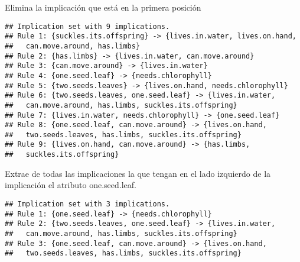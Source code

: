 \documentclass[
]{book}
\newenvironment{Shaded}{\begin{snugshade}}{\end{snugshade}}
\newcommand{\AttributeTok}[1]{\textcolor[rgb]{0.77,0.63,0.00}{#1}}
\newcommand{\DecValTok}[1]{\textcolor[rgb]{0.00,0.00,0.81}{#1}}
\newcommand{\FunctionTok}[1]{\textcolor[rgb]{0.00,0.00,0.00}{#1}}
\newcommand{\NormalTok}[1]{#1}
\newcommand{\OtherTok}[1]{\textcolor[rgb]{0.56,0.35,0.01}{#1}}
\newcommand{\SpecialCharTok}[1]{\textcolor[rgb]{0.00,0.00,0.00}{#1}}
\newcommand{\StringTok}[1]{\textcolor[rgb]{0.31,0.60,0.02}{#1}}
\begin{document}
Elimina la implicación que está en la primera posición

\begin{Shaded}
\end{Shaded}

\begin{verbatim}
## Implication set with 9 implications.
## Rule 1: {suckles.its.offspring} -> {lives.in.water, lives.on.hand,
##   can.move.around, has.limbs}
## Rule 2: {has.limbs} -> {lives.in.water, can.move.around}
## Rule 3: {can.move.around} -> {lives.in.water}
## Rule 4: {one.seed.leaf} -> {needs.chlorophyll}
## Rule 5: {two.seeds.leaves} -> {lives.on.hand, needs.chlorophyll}
## Rule 6: {two.seeds.leaves, one.seed.leaf} -> {lives.in.water,
##   can.move.around, has.limbs, suckles.its.offspring}
## Rule 7: {lives.in.water, needs.chlorophyll} -> {one.seed.leaf}
## Rule 8: {one.seed.leaf, can.move.around} -> {lives.on.hand,
##   two.seeds.leaves, has.limbs, suckles.its.offspring}
## Rule 9: {lives.on.hand, can.move.around} -> {has.limbs,
##   suckles.its.offspring}
\end{verbatim}

Extrae de todas las implicaciones la que tengan en el lado izquierdo de la implicación el atributo one.seed.leaf.

\begin{Shaded}
\end{Shaded}

\begin{verbatim}
## Implication set with 3 implications.
## Rule 1: {one.seed.leaf} -> {needs.chlorophyll}
## Rule 2: {two.seeds.leaves, one.seed.leaf} -> {lives.in.water,
##   can.move.around, has.limbs, suckles.its.offspring}
## Rule 3: {one.seed.leaf, can.move.around} -> {lives.on.hand,
##   two.seeds.leaves, has.limbs, suckles.its.offspring}
\end{verbatim}
\end{document}

